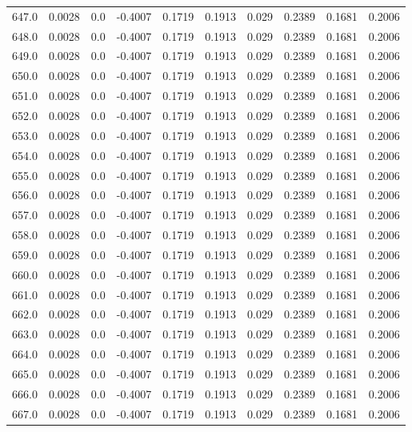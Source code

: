 \begin{longtable}{lrrrrrrrrr}
647.0 & 0.0028 & 0.0 & -0.4007 & 0.1719 & 0.1913 & 0.029 & 0.2389 & 0.1681 & 0.2006 \\
648.0 & 0.0028 & 0.0 & -0.4007 & 0.1719 & 0.1913 & 0.029 & 0.2389 & 0.1681 & 0.2006 \\
649.0 & 0.0028 & 0.0 & -0.4007 & 0.1719 & 0.1913 & 0.029 & 0.2389 & 0.1681 & 0.2006 \\
650.0 & 0.0028 & 0.0 & -0.4007 & 0.1719 & 0.1913 & 0.029 & 0.2389 & 0.1681 & 0.2006 \\
651.0 & 0.0028 & 0.0 & -0.4007 & 0.1719 & 0.1913 & 0.029 & 0.2389 & 0.1681 & 0.2006 \\
652.0 & 0.0028 & 0.0 & -0.4007 & 0.1719 & 0.1913 & 0.029 & 0.2389 & 0.1681 & 0.2006 \\
653.0 & 0.0028 & 0.0 & -0.4007 & 0.1719 & 0.1913 & 0.029 & 0.2389 & 0.1681 & 0.2006 \\
654.0 & 0.0028 & 0.0 & -0.4007 & 0.1719 & 0.1913 & 0.029 & 0.2389 & 0.1681 & 0.2006 \\
655.0 & 0.0028 & 0.0 & -0.4007 & 0.1719 & 0.1913 & 0.029 & 0.2389 & 0.1681 & 0.2006 \\
656.0 & 0.0028 & 0.0 & -0.4007 & 0.1719 & 0.1913 & 0.029 & 0.2389 & 0.1681 & 0.2006 \\
657.0 & 0.0028 & 0.0 & -0.4007 & 0.1719 & 0.1913 & 0.029 & 0.2389 & 0.1681 & 0.2006 \\
658.0 & 0.0028 & 0.0 & -0.4007 & 0.1719 & 0.1913 & 0.029 & 0.2389 & 0.1681 & 0.2006 \\
659.0 & 0.0028 & 0.0 & -0.4007 & 0.1719 & 0.1913 & 0.029 & 0.2389 & 0.1681 & 0.2006 \\
660.0 & 0.0028 & 0.0 & -0.4007 & 0.1719 & 0.1913 & 0.029 & 0.2389 & 0.1681 & 0.2006 \\
661.0 & 0.0028 & 0.0 & -0.4007 & 0.1719 & 0.1913 & 0.029 & 0.2389 & 0.1681 & 0.2006 \\
662.0 & 0.0028 & 0.0 & -0.4007 & 0.1719 & 0.1913 & 0.029 & 0.2389 & 0.1681 & 0.2006 \\
663.0 & 0.0028 & 0.0 & -0.4007 & 0.1719 & 0.1913 & 0.029 & 0.2389 & 0.1681 & 0.2006 \\
664.0 & 0.0028 & 0.0 & -0.4007 & 0.1719 & 0.1913 & 0.029 & 0.2389 & 0.1681 & 0.2006 \\
665.0 & 0.0028 & 0.0 & -0.4007 & 0.1719 & 0.1913 & 0.029 & 0.2389 & 0.1681 & 0.2006 \\
666.0 & 0.0028 & 0.0 & -0.4007 & 0.1719 & 0.1913 & 0.029 & 0.2389 & 0.1681 & 0.2006 \\
667.0 & 0.0028 & 0.0 & -0.4007 & 0.1719 & 0.1913 & 0.029 & 0.2389 & 0.1681 & 0.2006 \\

\end{longtable}
